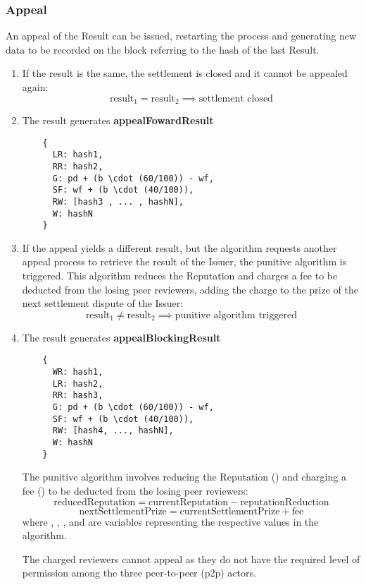 \documentclass{article}
\begin{document}
\subsubsection{Appeal}
An appeal of the Result can be issued, restarting the process and generating new data to be recorded on the block referring to the hash of the last Result.
\begin{enumerate}
    \item If the result is the same, the settlement is closed and it cannot be appealed again:
    \[\text{{result}}_1 = \text{{result}}_2 \implies \text{{settlement closed}} \]
    \item The result generates \textbf{appealFowardResult}
    \begin{verbatim}
    {
      LR: hash1,
      RR: hash2,
      G: pd + (b \cdot (60/100)) - wf,
      SF: wf + (b \cdot (40/100)),
      RW: [hash3 , ... , hashN],
      W: hashN
    }
    \end{verbatim}

    \item If the appeal yields a different result, but the algorithm requests another appeal process to retrieve the result of the Issuer, the punitive algorithm is triggered. This algorithm reduces the Reputation and charges a fee to be deducted from the losing peer reviewers, adding the charge to the prize of the next settlement dispute of the Issuer:
    \[ \text{{result}}_1 \neq \text{{result}}_2 \implies \text{{punitive algorithm triggered}} \]
    \item The result generates \textbf{appealBlockingResult}
    \begin{verbatim}
    {
      WR: hash1,
      LR: hash2,
      RR: hash3,
      G: pd + (b \cdot (60/100)) - wf,
      SF: wf + (b \cdot (40/100)),
      RW: [hash4, ..., hashN],
      W: hashN
    }
    \end{verbatim}
    The punitive algorithm involves reducing the Reputation () and charging a fee () to be deducted from the losing peer reviewers:
    \[ \text{{reducedReputation}} = \text{{currentReputation}} - \text{{reputationReduction}} \]
    \[ \text{{nextSettlementPrize}} = \text{{currentSettlementPrize}} + \text{{fee}} \]
    where , , , and  are variables representing the respective values in the algorithm.

The charged reviewers cannot appeal as they do not have the required level of permission among the three peer-to-peer (p2p) actors.


\end{enumerate}
\end{document}
